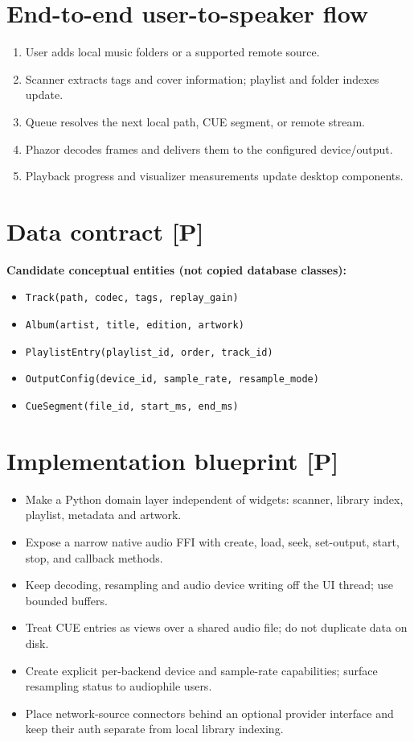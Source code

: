 \documentclass[10pt,a4paper,oneside]{report}
\begin{document}
\section{End-to-end user-to-speaker flow}
\begin{enumerate}[leftmargin=*,itemsep=2pt,topsep=2pt]
\item User adds local music folders or a supported remote source.
\item Scanner extracts tags and cover information; playlist and folder indexes update.
\item Queue resolves the next local path, CUE segment, or remote stream.
\item Phazor decodes frames and delivers them to the configured device/output.
\item Playback progress and visualizer measurements update desktop components.
\end{enumerate}
\section{Data contract [P]}
\begin{evidencebox}\small\textbf{Candidate conceptual entities (not copied database classes):}\par
\begin{itemize}[leftmargin=*,itemsep=1pt,topsep=2pt]
\item \texttt{Track(path, codec, tags, replay\_gain)}
\item \texttt{Album(artist, title, edition, artwork)}
\item \texttt{PlaylistEntry(playlist\_id, order, track\_id)}
\item \texttt{OutputConfig(device\_id, sample\_rate, resample\_mode)}
\item \texttt{CueSegment(file\_id, start\_ms, end\_ms)}
\end{itemize}\end{evidencebox}
\section{Implementation blueprint [P]}
\begin{itemize}[leftmargin=*,itemsep=2pt,topsep=3pt]
\item Make a Python domain layer independent of widgets: scanner, library index, playlist, metadata and artwork.
\item Expose a narrow native audio FFI with create, load, seek, set-output, start, stop, and callback methods.
\item Keep decoding, resampling and audio device writing off the UI thread; use bounded buffers.
\item Treat CUE entries as views over a shared audio file; do not duplicate data on disk.
\item Create explicit per-backend device and sample-rate capabilities; surface resampling status to audiophile users.
\item Place network-source connectors behind an optional provider interface and keep their auth separate from local library indexing.
\end{itemize}
\end{document}
